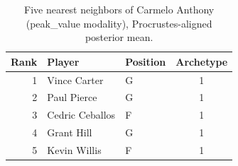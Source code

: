 \begin{table}[htbp]
  \centering\small
  \begin{tabular}{rllc}
    \toprule
    Rank & Player & Position & Archetype \\
    \midrule
    1 & Vince Carter & G & 1 \\
    2 & Paul Pierce & G & 1 \\
    3 & Cedric Ceballos & F & 1 \\
    4 & Grant Hill & G & 1 \\
    5 & Kevin Willis & F & 1 \\
    \bottomrule
  \end{tabular}
  \caption{Five nearest neighbors of Carmelo Anthony (peak_value modality), Procrustes-aligned posterior mean.}
  \label{tab:Carmelo_Anthony_neighbors_peak_value}
\end{table}

